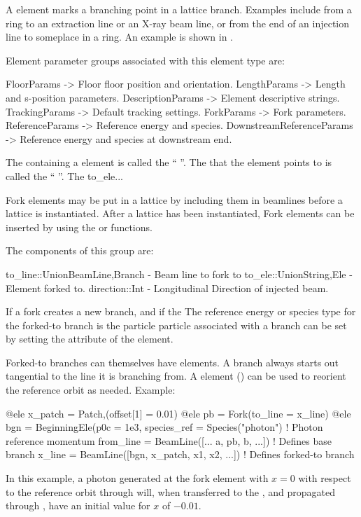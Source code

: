 A  element marks a branching point in a lattice branch. Examples include  from
a ring to an extraction line or an X-ray beam line, or  from the end of an injection line to
someplace in a ring. An example is shown in .

Element parameter groups associated with this element type are:
\TOPrule
\begin{example}
  FloorParams -> Floor floor position and orientation.  
  LengthParams        -> Length and s-position parameters.  
  DescriptionParams   -> Element descriptive strings.  
  TrackingParams      -> Default tracking settings.  
  ForkParams          -> Fork parameters. 
  ReferenceParams     -> Reference energy and species. 
  DownstreamReferenceParams -> Reference energy and species at downstream end. 
\end{example}
\BOTTOMrule

The  containing a  element is called the
`` ''. The  that the  element points to is called the
`` ''. The to_ele...

Fork elements may be put in a lattice by including them in beamlines before a lattice
is instantiated. After a lattice has been instantiated, Fork elements can be inserted
by using the  or  functions.

The components of this group are:
\begin{example}
  to_line::Union{BeamLine,Branch}   - Beam line to fork to
  to_ele::Union{String,Ele}         - Element forked to.
  direction::Int                    - Longitudinal Direction of injected beam.
\end{example}






If a fork creates a new branch, and if the The reference energy or species type for the forked-to branch is the particle 
particle associated with a branch can be set by setting the  attribute of the 
element.


Forked-to branches can themselves have  elements. A branch always starts out tangential to the
line it is branching from.  A  element () can be used to reorient the
reference orbit as needed. Example:
\begin{example}
  @ele x_patch = Patch,(offset[1] = 0.01)
  @ele pb = Fork(to_line = x_line)
  @ele bgn = BeginningEle(p0c = 1e3, species_ref = Species("photon")
                                                  ! Photon reference momentum   
  from_line = BeamLine([... a, pb, b, ...])       ! Defines base branch
  x_line = BeamLine([bgn, x_patch, x1, x2, ...])  ! Defines forked-to branch
\end{example}
In this example, a photon generated at the fork element  with $x = 0$ with respect to the
 reference orbit through  will, when transferred to the , and
propagated through , have an initial value for $x$ of $-0.01$.

